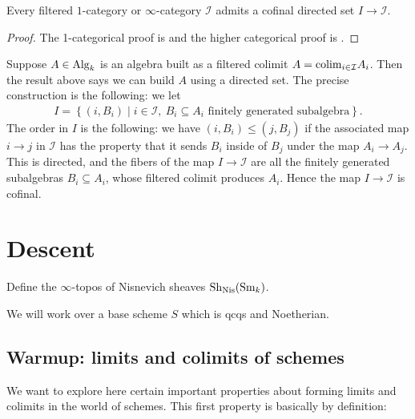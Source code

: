 \documentclass[11pt,openany]{book}
\begin{document}
\begin{proposition}\label{prop:stacks-0032} 
Every filtered $1$-category or $\infty$-category $\mathcal{I}$ admits a cofinal directed set $I \to \mathcal{I}$.
\end{proposition}
\begin{proof} The 1-categorical proof is \cite[0032]{Stacks} and the higher categorical proof is \cite[5.3.1.16]{HTT}.
\end{proof}

\begin{example} Suppose $A\in \mathrm{Alg}_k$ is an algebra built as a filtered colimit $A = \mathrm{colim}_{i\in \mathcal{I}} A_i$. Then the result above says we can build $A$ using a directed set. The precise construction is the following: we let
\begin{align*}
    I = \left\{ (i,B_i) \mid i\in \mathcal{I},\ B_i \subseteq A_i\text{ finitely generated subalgebra} \right\}.
\end{align*}
The order in $I$ is the following: we have $(i,B_i) \le (j,B_j)$ if the associated map $i \to j$ in $\mathcal{I}$ has the property that it sends $B_i$ inside of $B_j$ under the map $A_i \to A_j$. This is directed, and the fibers of the map $I \to \mathcal{I}$ are all the finitely generated subalgebras $B_i \subseteq A_i$, whose filtered colimit produces $A_i$. Hence the map $I \to \mathcal{I}$ is cofinal.
\end{example}






\section{Descent}

\begin{goal} Define the $\infty$-topos of Nisnevich sheaves $\mathrm{Sh}_{\mathrm{Nis}}(\mathrm{Sm}_k)$.
\end{goal}

\begin{assumption} We will work over a base scheme $S$ which is qcqs and Noetherian.
\end{assumption}


\subsection{Warmup: limits and colimits of schemes}

We want to explore here certain important properties about forming limits and colimits in the world of schemes. This first property is basically by definition:
\end{document}
